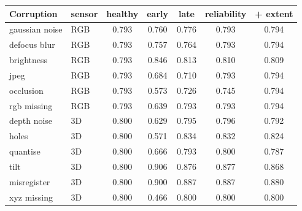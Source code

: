\begin{tabular}{llccccc}
\toprule
Corruption & sensor & healthy & early & late & reliability & + extent \\
\midrule
gaussian noise & RGB & 0.793 & 0.760 & 0.776 & 0.793 & 0.794 \\
defocus blur & RGB & 0.793 & 0.757 & 0.764 & 0.793 & 0.794 \\
brightness & RGB & 0.793 & 0.846 & 0.813 & 0.810 & 0.809 \\
jpeg & RGB & 0.793 & 0.684 & 0.710 & 0.793 & 0.794 \\
occlusion & RGB & 0.793 & 0.573 & 0.726 & 0.745 & 0.794 \\
rgb missing & RGB & 0.793 & 0.639 & 0.793 & 0.793 & 0.794 \\
depth noise & 3D & 0.800 & 0.629 & 0.795 & 0.796 & 0.792 \\
holes & 3D & 0.800 & 0.571 & 0.834 & 0.832 & 0.824 \\
quantise & 3D & 0.800 & 0.666 & 0.793 & 0.800 & 0.787 \\
tilt & 3D & 0.800 & 0.906 & 0.876 & 0.877 & 0.868 \\
misregister & 3D & 0.800 & 0.900 & 0.887 & 0.887 & 0.880 \\
xyz missing & 3D & 0.800 & 0.466 & 0.800 & 0.800 & 0.800 \\
\bottomrule
\end{tabular}
